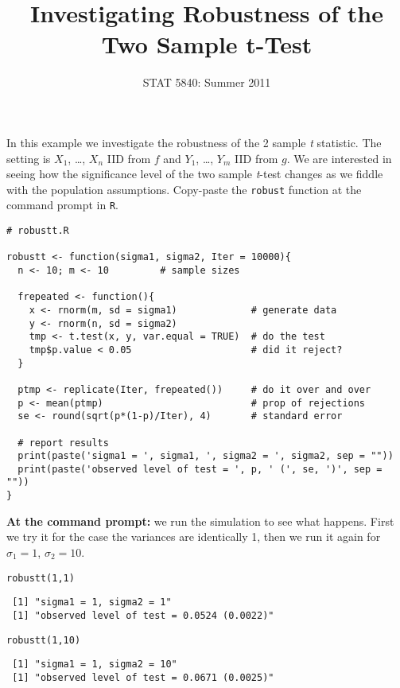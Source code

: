\documentclass[11pt,english]{article}
\title{Investigating Robustness of the Two Sample t-Test}
\date{STAT 5840: Summer 2011}
\begin{document}
\maketitle


In this example we investigate the robustness of the 2 sample \emph{t} statistic.  The setting is $X_{1}$, \ldots{}, $X_{n}$ IID from $f$ and $Y_{1}$, \ldots{}, $Y_{m}$ IID from $g$.  We are interested in seeing how the significance level of the two sample \emph{t}-test changes as we fiddle with the population assumptions.  Copy-paste the \texttt{robust} function at the command prompt in \texttt{R}.
\begin{verbatim}
# robustt.R

robustt <- function(sigma1, sigma2, Iter = 10000){
  n <- 10; m <- 10         # sample sizes

  frepeated <- function(){
    x <- rnorm(m, sd = sigma1)             # generate data
    y <- rnorm(n, sd = sigma2)  
    tmp <- t.test(x, y, var.equal = TRUE)  # do the test
    tmp$p.value < 0.05                     # did it reject? 
  }

  ptmp <- replicate(Iter, frepeated())     # do it over and over
  p <- mean(ptmp)                          # prop of rejections
  se <- round(sqrt(p*(1-p)/Iter), 4)       # standard error
  
  # report results
  print(paste('sigma1 = ', sigma1, ', sigma2 = ', sigma2, sep = ""))
  print(paste('observed level of test = ', p, ' (', se, ')', sep = ""))
}
\end{verbatim}


\bigskip
\noindent

\textbf{At the command prompt:} we run the simulation to see what happens.  First we try it for the case the variances are identically 1, then we run it again for $\sigma_{1} = 1$, $\sigma_{2} = 10$.

\begin{verbatim}
robustt(1,1)
\end{verbatim}

\begin{verbatim}
 [1] "sigma1 = 1, sigma2 = 1"
 [1] "observed level of test = 0.0524 (0.0022)"
\end{verbatim}


\begin{verbatim}
robustt(1,10)
\end{verbatim}

\begin{verbatim}
 [1] "sigma1 = 1, sigma2 = 10"
 [1] "observed level of test = 0.0671 (0.0025)"
\end{verbatim}
\end{document}
